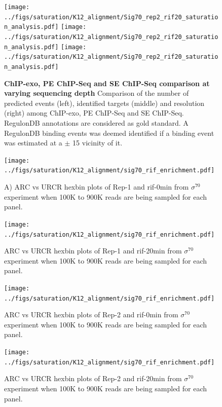 \documentclass{bmcart}\usepackage[]{graphicx}\usepackage[]{color}
\newcommand{\sig}{\sigma^{70}}
\begin{document}
\begin{figure}[h!]
  \texttt{[image: ../figs/saturation/K12\_alignment/Sig70\_rep2\_rif20\_saturation\_analysis.pdf]}
  \texttt{[image: ../figs/saturation/K12\_alignment/Sig70\_rep2\_rif20\_saturation\_analysis.pdf]}
  \texttt{[image: ../figs/saturation/K12\_alignment/Sig70\_rep2\_rif20\_saturation\_analysis.pdf]}
  \caption{\textbf{ChIP-exo, PE ChIP-Seq and SE ChIP-Seq comparison at
      varying sequencing depth} Comparison of the number of predicted
    events (left), identified targets (middle) and resolution (right)
    among ChIP-exo, PE ChIP-Seq and SE ChIP-Seq. RegulonDB annotations
    are considered as gold standard. A RegulonDB binding events was
    deemed identified if a binding event was estimated at a $\pm$ 15
    vicinity of it.}
  \label{fig:saturation_rif}
\end{figure}


\newpage

\begin{figure}[h!]
  \centering
  \texttt{[image: ../figs/saturation/K12\_alignment/sig70\_rif\_enrichment.pdf]}
  \caption{A) ARC vs URCR hexbin plots of Rep-1 and rif-0min from $\sig$ experiment when 100K to 900K reads are being
    sampled for each panel. }
  \label{fig:exoQC_sat1}
\end{figure}

\newpage

\begin{figure}[h!]
  \centering
  \texttt{[image: ../figs/saturation/K12\_alignment/sig70\_rif\_enrichment.pdf]}

  \caption{ARC vs URCR hexbin plots of Rep-1 and rif-20min from $\sig$ experiment when 100K to 900K reads are being
    sampled for each panel.}
  \label{fig:exoQC_sat2}
\end{figure}

\newpage

\begin{figure}[h!]
  \centering
  \texttt{[image: ../figs/saturation/K12\_alignment/sig70\_rif\_enrichment.pdf]}
  \caption{ARC vs URCR hexbin plots of Rep-2 and rif-0min from $\sig$ experiment when 100K to 900K reads are being
    sampled for each panel.}
  \label{fig:exoQC_sat3}
\end{figure}

\newpage

\begin{figure}[h!]
  \centering
  \texttt{[image: ../figs/saturation/K12\_alignment/sig70\_rif\_enrichment.pdf]}
  \caption{ARC vs URCR hexbin plots of Rep-2 and rif-20min from $\sig$ experiment when 100K to 900K reads are being
    sampled for each panel.}
  \label{fig:exoQC_sat4}
\end{figure}

\newpage




\end{document}
